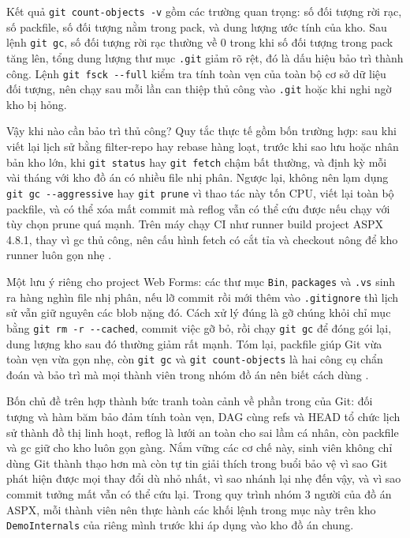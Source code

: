 Kết quả \verb|git count-objects -v| gồm các trường quan trọng: số đối tượng rời rạc, số packfile, số đối tượng nằm trong pack, và dung lượng ước tính của kho.
Sau lệnh \verb|git gc|, số đối tượng rời rạc thường về 0 trong khi số đối tượng trong pack tăng lên, tổng dung lượng thư mục \verb|.git| giảm rõ rệt, đó là dấu hiệu bảo trì thành công.
Lệnh \verb|git fsck --full| kiểm tra tính toàn vẹn của toàn bộ cơ sở dữ liệu đối tượng, nên chạy sau mỗi lần can thiệp thủ công vào \verb|.git| hoặc khi nghi ngờ kho bị hỏng.

Vậy khi nào cần bảo trì thủ công? Quy tắc thực tế gồm bốn trường hợp: sau khi viết lại lịch sử bằng filter-repo hay rebase hàng loạt, trước khi sao lưu hoặc nhân bản kho lớn, khi \verb|git status| hay \verb|git fetch| chậm bất thường, và định kỳ mỗi vài tháng với kho đồ án có nhiều file nhị phân.
Ngược lại, không nên lạm dụng \verb|git gc --aggressive| hay \verb|git prune| vì thao tác này tốn CPU, viết lại toàn bộ packfile, và có thể xóa mất commit mà reflog vẫn có thể cứu được nếu chạy với tùy chọn prune quá mạnh.
Trên máy chạy CI như runner build project ASPX 4.8.1, thay vì gc thủ công, nên cấu hình fetch có cắt tỉa và checkout nông để kho runner luôn gọn nhẹ \cite{gitlabci}.

Một lưu ý riêng cho project Web Forms: các thư mục \verb|Bin|, \verb|packages| và \verb|.vs| sinh ra hàng nghìn file nhị phân, nếu lỡ commit rồi mới thêm vào \verb|.gitignore| thì lịch sử vẫn giữ nguyên các blob nặng đó.
Cách xử lý đúng là gỡ chúng khỏi chỉ mục bằng \verb|git rm -r --cached|, commit việc gỡ bỏ, rồi chạy \verb|git gc| để đóng gói lại, dung lượng kho sau đó thường giảm rất mạnh.
Tóm lại, packfile giúp Git vừa toàn vẹn vừa gọn nhẹ, còn \verb|git gc| và \verb|git count-objects| là hai công cụ chẩn đoán và bảo trì mà mọi thành viên trong nhóm đồ án nên biết cách dùng \cite{progit}.

Bốn chủ đề trên hợp thành bức tranh toàn cảnh về phần trong của Git: đối tượng và hàm băm bảo đảm tính toàn vẹn, DAG cùng refs và HEAD tổ chức lịch sử thành đồ thị linh hoạt, reflog là lưới an toàn cho sai lầm cá nhân, còn packfile và gc giữ cho kho luôn gọn gàng.
Nắm vững các cơ chế này, sinh viên không chỉ dùng Git thành thạo hơn mà còn tự tin giải thích trong buổi bảo vệ vì sao Git phát hiện được mọi thay đổi dù nhỏ nhất, vì sao nhánh lại nhẹ đến vậy, và vì sao commit tưởng mất vẫn có thể cứu lại.
Trong quy trình nhóm 3 người của đồ án ASPX, mỗi thành viên nên thực hành các khối lệnh trong mục này trên kho \verb|DemoInternals| của riêng mình trước khi áp dụng vào kho đồ án chung.

